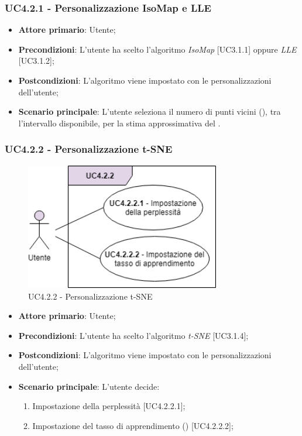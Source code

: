 \subsubsection{UC4.2.1 - Personalizzazione IsoMap e LLE}
\begin{itemize}
	\item \textbf{Attore primario}: Utente;
	
	\item \textbf{Precondizioni}: L'utente ha scelto l'algoritmo \textit{IsoMap} [UC3.1.1] oppure \textit{LLE} [UC3.1.2];
	
	\item \textbf{Postcondizioni}: L'algoritmo viene impostato con le personalizzazioni dell'utente;
	
	\item \textbf{Scenario principale}: L'utente seleziona il numero di punti vicini (), tra l'intervallo disponibile, per la stima approssimativa del .

\end{itemize}

\newpage

\subsubsection{UC4.2.2 - Personalizzazione t-SNE}
\begin{figure}[h]
\includegraphics[width=8.5cm]{Section/Images/UC4.2.2.png}
\centering
\caption{UC4.2.2 - Personalizzazione t-SNE}
\end{figure}
\begin{itemize}
	\item \textbf{Attore primario}: Utente;
	
	\item \textbf{Precondizioni}: L'utente ha scelto l'algoritmo \textit{t-SNE} [UC3.1.4];
	
	\item \textbf{Postcondizioni}: L'algoritmo viene impostato con le personalizzazioni dell'utente;
	
	\item \textbf{Scenario principale}: L'utente decide:

\begin{enumerate}
\item Impostazione della perplessità [UC4.2.2.1];
\item Impostazione del tasso di apprendimento () [UC4.2.2.2];
\end{enumerate}	

\end{itemize}
	
